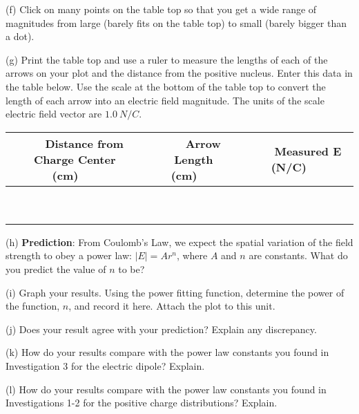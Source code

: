 (f) Click on many points on the table top so that you get a wide range of magnitudes from large
(barely fits on the table top) to small (barely bigger than a dot).

(g) Print the table top and use a ruler to measure the lengths of each of the arrows
on your plot and the distance from the positive nucleus. 
Enter this data in the table below.
Use the scale at the bottom of the table top to convert the length of each arrow into 
an electric field magnitude.
The units of the scale electric field vector are $1.0 ~ N/C$.

\vspace{0.3cm}
{\centering \begin{tabular}{|c|c|c|}
\hline 
~~~Distance from Charge Center (cm)~~~&
~~~Arrow Length (cm)~~~&
~~~Measured E (N/C)~~~\\
\hline
\hline 
&
&
\\
\hline 
&
&
\\
\hline 
&
&
\\
\hline 
&
&
\\
\hline 
&
&
\\
\hline 
&
&
\\
\hline 
&
&
\\
\hline 
&
&
\\
\hline 
&
&
\\
\hline
\end{tabular}\par}
\vspace{0.3cm}


(h) \textbf{Prediction}: From Coulomb's Law, we expect the spatial variation
of the field strength to obey a power law: \( \left| E\right| =Ar^{n} \),
where \( A \) and \( n \) are constants. What do you predict the
value of \( n \) to be?\vspace{15mm}

(i) Graph your results. Using the power fitting
function, determine the power of the function, $n$, and record it here.
Attach the plot to this unit.
\vspace{15mm}

(j) Does your result agree with your prediction? Explain any discrepancy.\vspace{15mm}

(k) How do your results compare with the power law constants you found
in Investigation 3 for the electric dipole? Explain.\vspace{15mm}

(l) How do your results compare with the power law constants you found
in Investigations 1-2 for the positive charge distributions? Explain.\vspace{15mm}


